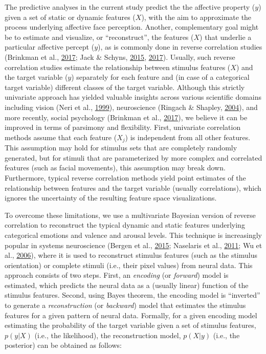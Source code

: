 \documentclass[11pt,american,a4paper,oneside,]{memoir} %
\begin{document}
The predictive analyses in the current study predict the the affective property (\(y\)) given a set of static or dynamic features (\(X\)), with the aim to approximate the process underlying affective face perception. Another, complementary goal might be to estimate and visualize, or ``reconstruct'', the features (\(X\)) that underlie a particular affective percept (\(y\)), as is commonly done in reverse correlation studies (Brinkman et al., \protect\hyperlink{ref-Brinkman2017-hg}{2017}; Jack \& Schyns, \protect\hyperlink{ref-Jack2015-sh}{2015}, \protect\hyperlink{ref-Jack2017-gt}{2017}). Usually, such reverse correlation studies estimate the relationship between stimulus features (\(X\)) and the target variable (\(y\)) separately for each feature and (in case of a categorical target variable) different classes of the target variable. Although this strictly univariate approach has yielded valuable insights across various scientific domains including vision (Neri et al., \protect\hyperlink{ref-Neri1999-rj}{1999}), neuroscience (Ringach \& Shapley, \protect\hyperlink{ref-Ringach2004-nn}{2004}), and more recently, social psychology (Brinkman et al., \protect\hyperlink{ref-Brinkman2017-hg}{2017}), we believe it can be improved in terms of parsimony and flexibility. First, univariate correlation methods assume that each feature (\(X_{j}\)) is independent from all other features. This assumption may hold for stimulus sets that are completely randomly generated, but for stimuli that are parameterized by more complex and correlated features (such as facial movements), this assumption may break down. Furthermore, typical reverse correlation methods yield point estimates of the relationship between features and the target variable (usually correlations), which ignores the uncertainty of the resulting feature space visualizations.

To overcome these limitations, we use a multivariate Bayesian version of reverse correlation to reconstruct the typical dynamic and static features underlying categorical emotions and valence and arousal levels. This technique is increasingly popular in systems neuroscience (Bergen et al., \protect\hyperlink{ref-Van_Bergen2015-kl}{2015}; Naselaris et al., \protect\hyperlink{ref-Naselaris2011-oh}{2011}; Wu et al., \protect\hyperlink{ref-Wu2006-qs}{2006}), where it is used to reconstruct stimulus features (such as the stimulus orientation) or complete stimuli (i.e., their pixel values) from neural data. This approach consists of two steps. First, an \emph{encoding} (or \emph{forward}) model is estimated, which predicts the neural data as a (usually linear) function of the stimulus features. Second, using Bayes theorem, the encoding model is ``inverted'' to generate a \emph{reconstruction} (or \emph{backward}) model that estimates the stimulus features for a given pattern of neural data. Formally, for a given encoding model estimating the probability of the target variable given a set of stimulus features, \(p(y | X)\) (i.e., the likelihood), the reconstruction model, \(p(X | y)\) (i.e., the posterior) can be obtained as follows:
\end{document}
